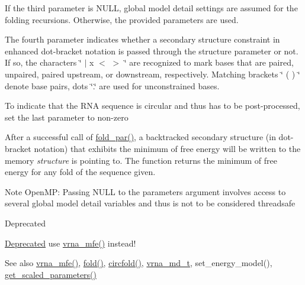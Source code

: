 If the third parameter is N\+U\+LL, global model detail settings are assumed for the folding recursions. Otherwise, the provided parameters are used.

The fourth parameter indicates whether a secondary structure constraint in enhanced dot-\/bracket notation is passed through the structure parameter or not. If so, the characters \char`\"{} $\vert$ x $<$ $>$ \char`\"{} are recognized to mark bases that are paired, unpaired, paired upstream, or downstream, respectively. Matching brackets \char`\"{} ( ) \char`\"{} denote base pairs, dots \char`\"{}.\char`\"{} are used for unconstrained bases.

To indicate that the R\+NA sequence is circular and thus has to be post-\/processed, set the last parameter to non-\/zero

After a successful call of \hyperlink{group__mfe__fold__single_ga2bc41df5d71fee6fd8da9904ee65d8fb}{fold\+\_\+par()}, a backtracked secondary structure (in dot-\/bracket notation) that exhibits the minimum of free energy will be written to the memory {\itshape structure} is pointing to. The function returns the minimum of free energy for any fold of the sequence given.

\begin{DoxyNote}{Note}
Open\+MP\+: Passing N\+U\+LL to the \textquotesingle{}parameters\textquotesingle{} argument involves access to several global model detail variables and thus is not to be considered threadsafe
\end{DoxyNote}
\begin{DoxyRefDesc}{Deprecated}
\item[\hyperlink{deprecated__deprecated000068}{Deprecated}]use \hyperlink{group__mfe__fold_gabd3b147371ccf25c577f88bbbaf159fd}{vrna\+\_\+mfe()} instead!\end{DoxyRefDesc}


\begin{DoxySeeAlso}{See also}
\hyperlink{group__mfe__fold_gabd3b147371ccf25c577f88bbbaf159fd}{vrna\+\_\+mfe()}, \hyperlink{group__mfe__fold__single_gaadafcb0f140795ae62e5ca027e335a9b}{fold()}, \hyperlink{group__mfe__fold__single_ga4ac63ab3e8d9a80ced28b8052d94e423}{circfold()}, \hyperlink{group__model__details_ga1f8a10e12a0a1915f2a4eff0b28ea17c}{vrna\+\_\+md\+\_\+t}, set\+\_\+energy\+\_\+model(), \hyperlink{group__energy__parameters_ga7fa6a000d7c16feab939f2c4ee626197}{get\+\_\+scaled\+\_\+parameters()}
\end{DoxySeeAlso}

